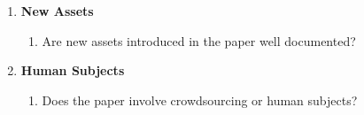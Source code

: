 \begin{enumerate}
\item {\bf New Assets}
    \begin{enumerate}
        \item Are new assets introduced in the paper well documented?
    \end{enumerate}

\item {\bf Human Subjects}
    \begin{enumerate}
        \item Does the paper involve crowdsourcing or human subjects?
        \answerNo{}
    \end{enumerate}

\end{enumerate}
